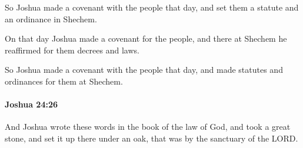			\begin{versebox}
					\item[BHS] 
					\item[ASV] So Joshua made a covenant with the people that day, and set them a statute and an ordinance in Shechem.
					\item[NIV] On that day Joshua made a covenant for the people, and there at Shechem he reaffirmed for them decrees and laws.
					\item[NRSV] So Joshua made a covenant with the people that day, and made statutes and ordinances for them at Shechem.
			\end{versebox}

		\paragraph{Joshua 24:26} %
			\label{JOSHUA-24-26}

			And Joshua wrote these words in the book of the law of God, and took a great stone, and set it up there under an oak, that was by the sanctuary of the LORD.

